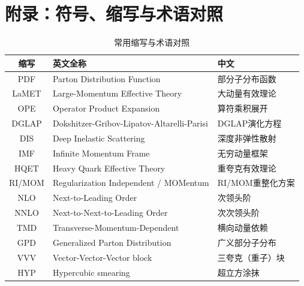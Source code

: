 \documentclass[11pt,a4paper]{ctexart}
\begin{document}
\section{附录：符号、缩写与术语对照}

\begin{table}[htbp]
\centering
\caption{常用缩写与术语对照}
\begin{tabular}{c l l}
\toprule
\textbf{缩写} & \textbf{英文全称} & \textbf{中文} \\
\midrule
PDF & Parton Distribution Function & 部分子分布函数 \\
LaMET & Large-Momentum Effective Theory & 大动量有效理论 \\
OPE & Operator Product Expansion & 算符乘积展开 \\
DGLAP & Dokshitzer-Gribov-Lipatov-Altarelli-Parisi & DGLAP演化方程 \\
DIS & Deep Inelastic Scattering & 深度非弹性散射 \\
IMF & Infinite Momentum Frame & 无穷动量框架 \\
HQET & Heavy Quark Effective Theory & 重夸克有效理论 \\
RI/MOM & Regularization Independent / MOMentum & RI/MOM重整化方案 \\
NLO & Next-to-Leading Order & 次领头阶 \\
NNLO & Next-to-Next-to-Leading Order & 次次领头阶 \\
TMD & Transverse-Momentum-Dependent & 横向动量依赖 \\
GPD & Generalized Parton Distribution & 广义部分子分布 \\
VVV & Vector-Vector-Vector block & 三夸克（重子）块 \\
HYP & Hypercubic smearing & 超立方涂抹 \\
\bottomrule
\end{tabular}
\end{table}
\end{document}
